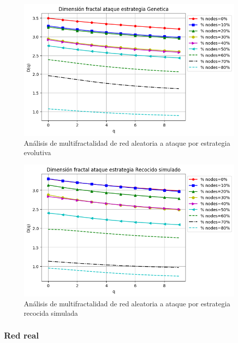 \begin{figure}[H]
    \centering
    \includegraphics[scale=0.7]{Capitulo6MultifractalidadYRobustez/imagenes/grafica_DqGenetic20180501_072543Random1991Nodes5939.png}
    \caption{Análisis de multifractalidad de red aleatoria a ataque por estrategia evolutiva}
\end{figure}

\begin{figure}[H]
    \centering
    \includegraphics[scale=0.7]{Capitulo6MultifractalidadYRobustez/imagenes/grafica_DqSimulated20180501_072543Random1991Nodes5939.png}
    \caption{Análisis de multifractalidad de red aleatoria a ataque por estrategia recocida simulada }
\end{figure}

\subsubsection{Red real}

